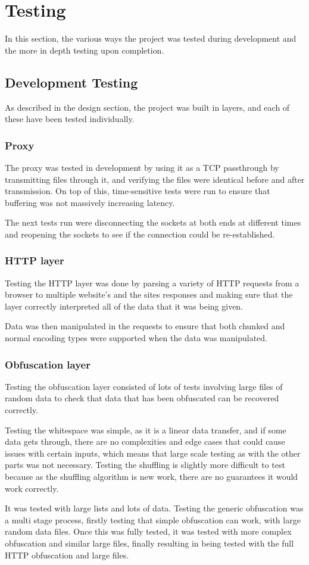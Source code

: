 \def\listingsfont{\ttfamily}
\section{Testing}
In this section, the various ways the project was tested during development and the more in depth testing upon completion.
\subsection{Development Testing}
As described in the design section, the project was built in layers, and each of these have been tested individually.
\subsubsection{Proxy}
The proxy was tested in development by using it as a TCP passthrough by transmitting files through it, and verifying the files were identical before and after transmission.
On top of this, time-sensitive tests were run to ensure that buffering was not massively increasing latency.\par
The next tests run were disconnecting the sockets at both ends at different times and reopening the sockets to see if the connection could be re-established.\par
\subsubsection{HTTP layer}
Testing the HTTP layer was done by parsing a variety of HTTP requests from a browser to multiple website's and the sites responses and making sure that the layer correctly interpreted all of the data that it was being given.\par
Data was then manipulated in the requests to ensure that both chunked and normal encoding types were supported when the data was manipulated.
\subsubsection{Obfuscation layer}
Testing the obfuscation layer consisted of lots of tests involving large files of random data to check that data that has been obfuscated can be recovered correctly.\par
Testing the whitespace was simple, as it is a linear data transfer, and if some data gets through, there are no complexities and edge cases that could cause issues with certain inputs, which means that large scale testing as with the other parts was not necessary.
Testing the shuffling is slightly more difficult to test because as the shuffling algorithm is new work, there are no guarantees it would work correctly.\par It was tested with large lists and lots of data.
Testing the generic obfuscation was a multi stage process, firstly testing that simple obfuscation can work, with large random data files. Once this was fully tested, it was tested with more complex obfuscation and similar large files, finally resulting in being tested with the full HTTP obfuscation and large files.
